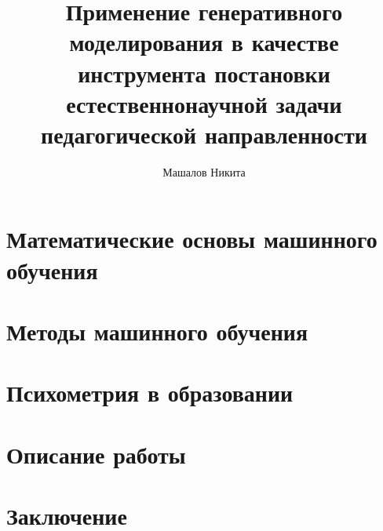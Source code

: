 \documentclass{mipt-thesis-bs}
\title{Применение генеративного моделирования в качестве инструмента постановки естественнонаучной задачи педагогической направленности}
\author{Машалов Никита}
\begin{document}

\tableofcontents

\pagebreak


\chapter{Математические основы машинного обучения}

\chapter{Методы машинного обучения}

\chapter{Психометрия в образовании}

\chapter{Описание работы}

\chapter{Заключение}


\printbib


\end{document}
